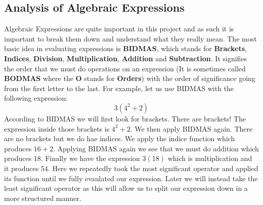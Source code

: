 \documentclass[../../../../../main.tex]{subfiles}
\begin{document}
\subsection{Analysis of Algebraic Expressions}
Algebraic Expressions are quite important in this project and as such it is important to break them down and understand what they really mean. The most basic idea in evaluating expressions is \textbf{BIDMAS}, which stands for \textbf{Brackets}, \textbf{Indices}, \textbf{Division}, \textbf{Multiplication}, \textbf{Addition} and \textbf{Subtraction}. It signifies the order that we must do operations on an expression (It is sometimes called \textbf{BODMAS} where the \textbf{O} stands for \textbf{Orders}) with the order of significance going from the first letter to the last. For example, let us use BIDMAS with the following expression:
\[3(4^2+2)\]
According to BIDMAS we will first look for brackets. There are brackets! The expression inside those brackets is $4^2+2$. We then apply BIDMAS again. There are no brackets but we do hae indices. We apply the indice function which produces $16+2$. Applying BIDMAS again we see that we must do addition which produces $18$. Finally we have the expression $3(18)$ which is multiplication and it produces $54$. Here we repeatedly took the most significant operator and applied its function until we fully evaulated our expression. Later we will instead take the least significant operator as this will allow us to split our expression down in a more structured manner.
\end{document}

